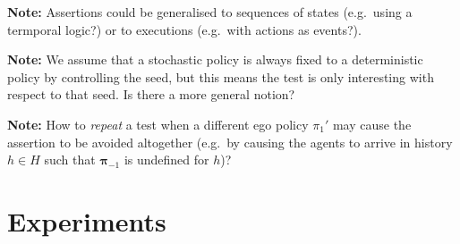 \documentclass[10pt]{article}
\theoremstyle{plain}
\newcommand{\vect}[1]{\bm{#1}}
\newenvironment{note}[1][Note]{
    \begin{center}
    	\begin{minipage}{0.9\linewidth}
    		\begin{mdframed}[backgroundcolor=yellow!25,linewidth=0pt]
    			\textbf{#1:} }{
    		\end{mdframed}
    	\end{minipage}
    \end{center}
}
\begin{document}
\begin{note}
    Assertions could be generalised to sequences of states (e.g.\ using a termporal logic?) or to executions (e.g.\ with actions as events?).
\end{note}

\begin{note}
    We assume that a stochastic policy is always fixed to a deterministic policy by controlling the seed, but this means the test is only interesting with respect to that seed.
    Is there a more general notion?
\end{note}

\begin{note}
    How to \emph{repeat} a test when a different ego policy $\pi_{1}'$ may cause the assertion to be avoided altogether (e.g.\ by causing the agents to arrive in history $h \in H$ such that $\vect{\pi}_{-1}$ is undefined for $h$)?
\end{note}

\newpage
\section{Experiments}\label{section:case-study}
\end{document}
